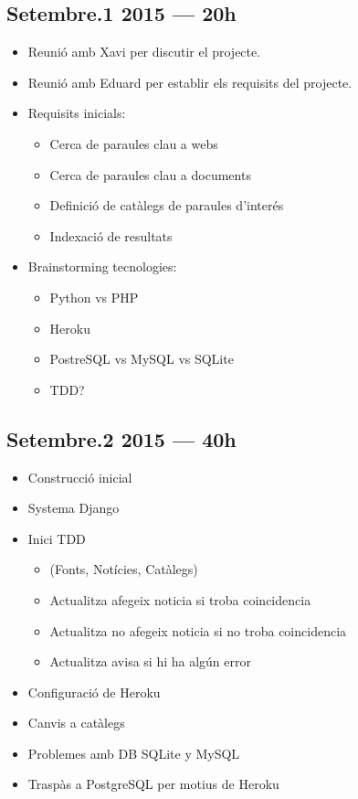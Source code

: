 \documentclass{article}
\begin{document}
\subsection{Setembre.1 2015 --- 20h}

\begin{itemize}
    \item Reunió amb Xavi per discutir el projecte.
    \item Reunió amb Eduard per establir els requisits del projecte.
    \item Requisits inicials: 
    \begin{itemize}
        \item Cerca de paraules clau a webs
        \item Cerca de paraules clau a documents
        \item Definició de catàlegs de paraules d'interés
        \item Indexació de resultats
    \end{itemize}
    \item Brainstorming tecnologies:
    \begin{itemize}
        \item Python vs PHP
        \item Heroku
        \item PostreSQL vs MySQL vs SQLite
        \item TDD\@?
    \end{itemize}
\end{itemize}

\subsection{Setembre.2 2015 --- 40h}

\begin{itemize}
    \item  Construcció inicial
    \item  Systema Django
    \item  Inici TDD 
	\begin{itemize}
	\item  (Fonts, Notícies, Catàlegs)
	\item  Actualitza afegeix noticia si troba coincidencia
	\item  Actualitza no afegeix noticia si no troba coincidencia
	\item  Actualitza avisa si hi ha algún error
	\end{itemize}
    \item  Configuració de Heroku
    \item  Canvis a catàlegs
    \item  Problemes amb DB SQLite y MySQL
    \item  Traspàs a PostgreSQL per motius de Heroku
\end{itemize}
\end{document}
